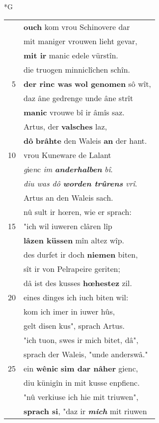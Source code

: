 \documentclass[8pt,a4paper,notitlepage]{article}
\begin{document}
\newpage
\begin{table}[ht]
\begin{minipage}[t]{0.5\linewidth}
\small
\begin{center}*G
\end{center}
\begin{tabular}{rl}
 & \textbf{ouch} kom vrou Schinovere dar\\ 
 & mit maniger vrouwen lieht gevar,\\ 
 & \textbf{mit ir} manic edele vürstîn.\\ 
 & die truogen minniclîchen schîn.\\ 
5 & \textbf{der rinc was} \textbf{wol genomen} sô wît,\\ 
 & daz âne gedrenge unde âne strît\\ 
 & \textbf{manic} vrouwe bî ir âmîs saz.\\ 
 & Artus, der \textbf{valsches} laz,\\ 
 & \textbf{dô} \textbf{brâhte} den Waleis \textbf{an} der hant.\\ 
10 & vrou Kuneware de Lalant\\ 
 & \textit{g}ie\textit{n}c \textit{im} \textit{\textbf{anderhalben}} \textit{bî}.\\ 
 & \textit{diu was dô \textbf{worden trûrens} vrî}.\\ 
 & Artus an den Waleis sach.\\ 
 & nû sult ir hœren, wie er sprach:\\ 
15 & "ich wil iuweren clâren lîp\\ 
 & \textbf{lâzen küssen} mîn altez wîp.\\ 
 & des durfet ir doch \textbf{niemen} biten,\\ 
 & sît ir von Pelrapeire geriten;\\ 
 & dâ ist des kusses \textbf{hœhestez} zil.\\ 
20 & eines dinges ich iuch biten wil:\\ 
 & kom ich imer in iuwer hûs,\\ 
 & gelt disen kus", sprach Artus.\\ 
 & "ich tuon, swes ir mich bitet, dâ",\\ 
 & sprach der Waleis, "unde anderswâ."\\ 
25 & ein \textbf{wênic} \textbf{sim dar nâher} gienc,\\ 
 & diu künigîn in mit kusse enpfienc.\\ 
 & "nû verkiuse ich hie mit triuwen",\\ 
 & \textbf{sprach si}, "daz ir \textbf{\textit{mich}} mit riuwen\\ 

\end{tabular}
\end{minipage}
\end{table}
\end{document}
